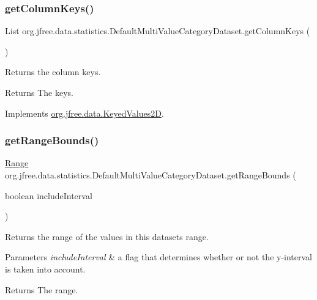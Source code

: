 \subsubsection{\texorpdfstring{get\+Column\+Keys()}{getColumnKeys()}}
{\footnotesize\ttfamily List org.\+jfree.\+data.\+statistics.\+Default\+Multi\+Value\+Category\+Dataset.\+get\+Column\+Keys (\begin{DoxyParamCaption}{ }\end{DoxyParamCaption})}

Returns the column keys.

\begin{DoxyReturn}{Returns}
The keys. 
\end{DoxyReturn}


Implements \mbox{\hyperlink{interfaceorg_1_1jfree_1_1data_1_1_keyed_values2_d_af6b8780fee7cccdb967fc0f199398615}{org.\+jfree.\+data.\+Keyed\+Values2D}}.

\mbox{\label{classorg_1_1jfree_1_1data_1_1statistics_1_1_default_multi_value_category_dataset_a30d182a50c2a77a29a772029d2ca3354}} 
\subsubsection{\texorpdfstring{get\+Range\+Bounds()}{getRangeBounds()}}
{\footnotesize\ttfamily \mbox{\hyperlink{classorg_1_1jfree_1_1data_1_1_range}{Range}} org.\+jfree.\+data.\+statistics.\+Default\+Multi\+Value\+Category\+Dataset.\+get\+Range\+Bounds (\begin{DoxyParamCaption}\item[{boolean}]{include\+Interval }\end{DoxyParamCaption})}

Returns the range of the values in this dataset\textquotesingle{}s range.


\begin{DoxyParams}{Parameters}
{\em include\+Interval} & a flag that determines whether or not the y-\/interval is taken into account. \\
\hline
\end{DoxyParams}
\begin{DoxyReturn}{Returns}
The range. 
\end{DoxyReturn}


